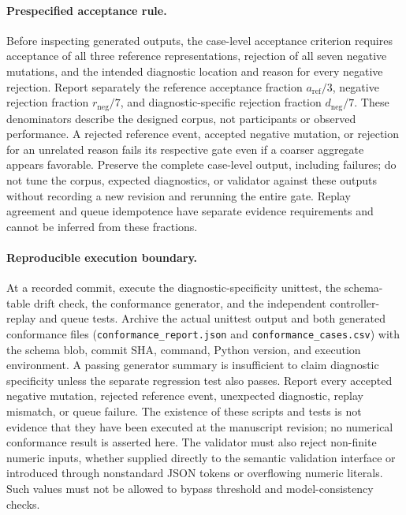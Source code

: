 \paragraph{Prespecified acceptance rule.}
Before inspecting generated outputs, the case-level acceptance criterion requires acceptance of all three reference representations, rejection of all seven negative mutations, and the intended diagnostic location and reason for every negative rejection. Report separately the reference acceptance fraction $a_{\mathrm{ref}}/3$, negative rejection fraction $r_{\mathrm{neg}}/7$, and diagnostic-specific rejection fraction $d_{\mathrm{neg}}/7$. These denominators describe the designed corpus, not participants or observed performance. A rejected reference event, accepted negative mutation, or rejection for an unrelated reason fails its respective gate even if a coarser aggregate appears favorable. Preserve the complete case-level output, including failures; do not tune the corpus, expected diagnostics, or validator against these outputs without recording a new revision and rerunning the entire gate. Replay agreement and queue idempotence have separate evidence requirements and cannot be inferred from these fractions.

\paragraph{Reproducible execution boundary.}
At a recorded commit, execute the diagnostic-specificity unittest, the schema-table drift check, the conformance generator, and the independent controller-replay and queue tests. Archive the actual unittest output and both generated conformance files (\nolinkurl{conformance_report.json} and \nolinkurl{conformance_cases.csv}) with the schema blob, commit SHA, command, Python version, and execution environment. A passing generator summary is insufficient to claim diagnostic specificity unless the separate regression test also passes. Report every accepted negative mutation, rejected reference event, unexpected diagnostic, replay mismatch, or queue failure. The existence of these scripts and tests is not evidence that they have been executed at the manuscript revision; no numerical conformance result is asserted here. The validator must also reject non-finite numeric inputs, whether supplied directly to the semantic validation interface or introduced through nonstandard JSON tokens or overflowing numeric literals. Such values must not be allowed to bypass threshold and model-consistency checks.

